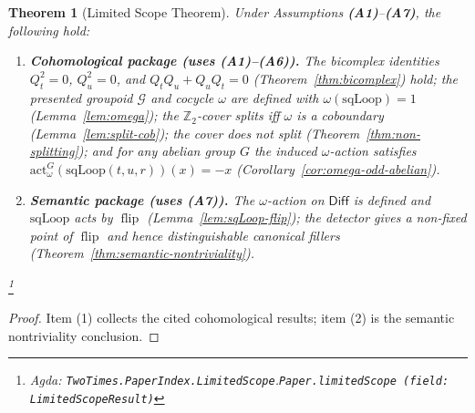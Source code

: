 \documentclass{article}
\newcommand{\Diff}{\mathsf{Diff}}
\newcommand{\flip}{\operatorname{flip}}
\newcommand{\Ztwo}{\mathbb{Z}_2}
\newcommand{\Agda}[1]{\texttt{#1}}
\newcommand{\AgdaRef}[2]{\emph{Agda: }\Agda{#1}.\Agda{#2}}
\newcommand{\AgdaNote}[2]{\footnote{\AgdaRef{#1}{#2}}}
\theoremstyle{definition}
\theoremstyle{plain}
\newtheorem{theorem}{Theorem}[section]
\begin{document}
\begin{theorem}[Limited Scope Theorem]
\label{thm:limited-scope}
Under Assumptions \textbf{(A1)}--\textbf{(A7)}, the following hold:
\begin{enumerate}[label=\textbf{(\arabic*)},leftmargin=*,itemsep=0.4em]
\item \textbf{Cohomological package (uses \textbf{(A1)}--\textbf{(A6)}).}
The bicomplex identities $Q_t^2=0$, $Q_u^2=0$, and $Q_tQ_u+Q_uQ_t=0$
(Theorem~\ref{thm:bicomplex}) hold; the presented groupoid $\mathcal G$ and cocycle
$\omega$ are defined with $\omega(\mathrm{sqLoop})=1$ (Lemma~\ref{lem:omega});
the $\Ztwo$-cover splits iff $\omega$ is a coboundary (Lemma~\ref{lem:split-cob});
the cover does not split (Theorem~\ref{thm:non-splitting}); and for any abelian
group $G$ the induced $\omega$-action satisfies
$\mathrm{act}^G_{\omega}(\mathrm{sqLoop}(t,u,r))(x)=-x$
(Corollary~\ref{cor:omega-odd-abelian}).
\item \textbf{Semantic package (uses \textbf{(A7)}).}
The $\omega$-action on $\Diff$ is defined and $\mathrm{sqLoop}$ acts by $\flip$
(Lemma~\ref{lem:sqLoop-flip}); the detector gives a non-fixed point of $\flip$
and hence distinguishable canonical fillers (Theorem~\ref{thm:semantic-nontriviality}).
\end{enumerate}
\AgdaNote{TwoTimes.PaperIndex.LimitedScope}{Paper.limitedScope (field: LimitedScopeResult)}
\end{theorem}

\begin{proof}
Item (1) collects the cited cohomological results; item (2) is the semantic
nontriviality conclusion.
\end{proof}

\appendix
\end{document}

